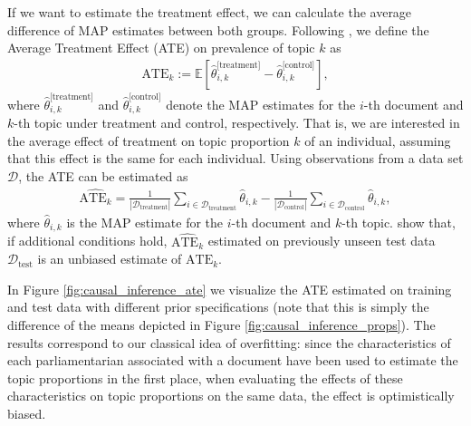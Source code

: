 If we want to estimate the treatment effect, we can calculate the average difference of MAP estimates between both groups. Following \cite{egami2018make}, we define the Average Treatment Effect (ATE) on prevalence of topic $k$ as
\begin{align}
\text{ATE}_k := \mathbb{E}[\hat{\theta}^{\text{[treatment]}}_{i,k} - \hat{\theta}^{\text{[control]}}_{i,k}],
\end{align}
where $\hat{\theta}^{\text{[treatment]}}_{i,k}$ and $\hat{\theta}^{\text{[control]}}_{i,k}$ denote the MAP estimates for the $i$-th document and $k$-th topic under treatment and control, respectively. That is, we are interested in the average effect of treatment on topic proportion $k$ of an individual, assuming that this effect is the same for each individual. 
Using observations from a data set $\mathcal{D}$, the ATE can be estimated as 
\begin{align}
\widehat{\text{ATE}_k} = \frac{1}{|\mathcal{D}_{\text{treatment}}|}\sum_{i \in \mathcal{D}_{\text{treatment}}} \hat{\theta}_{i,k} - \frac{1}{|\mathcal{D}_{\text{control}}|}\sum_{i \in \mathcal{D}_{\text{control}}} \hat{\theta}_{i,k},
\end{align} 
where $\hat{\theta}_{i,k}$ is the MAP estimate for the $i$-th document and $k$-th topic. \cite{egami2018make} show that, if additional conditions hold, $\widehat{\text{ATE}_k}$ estimated on previously unseen test data $\mathcal{D}_{\text{test}}$ is an unbiased estimate of $\text{ATE}_k$.

In Figure \ref{fig:causal_inference_ate} we visualize the ATE estimated on training and test data with different prior specifications (note that this is simply the difference of the means depicted in Figure \ref{fig:causal_inference_props}). The results correspond to our classical idea of overfitting: since the characteristics of each parliamentarian associated with a document have been used to estimate the topic proportions in the first place, when evaluating the effects of these characteristics on topic proportions on the same data, the effect is optimistically biased.

